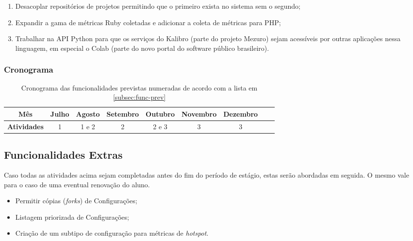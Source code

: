 \documentclass[12pt]{article}
\begin{document}
      \begin{enumerate}
        \item Desacoplar repositórios de projetos permitindo que o primeiro exista no sistema sem o segundo;
        \item Expandir a gama de métricas Ruby coletadas e adicionar a coleta de métricas para PHP;
        \item Trabalhar na API Python para que os serviços do Kalibro (parte do projeto Mezuro) sejam acessíveis por outras aplicações nessa linguagem, em especial o Colab (parte do novo portal do software público brasileiro).
      \end{enumerate}

      \subsubsection{Cronograma}
        \begin{table}[H]
          \begin{tabu}{| c | c | c | c | c | c | c | c | c |}
            \hline
            \textbf{Mês} & Julho & Agosto & Setembro & Outubro & Novembro & Dezembro\\ \hline
            \textbf{Atividades} & 1 & 1 e 2 & 2 & 2 e 3 & 3 & 3 \\ \hline
          \end{tabu}
          \caption{Cronograma das funcionalidades previstas numeradas de acordo com a lista em \ref{subsec:func-prev}}
        \end{table}

    \subsection{Funcionalidades Extras}
      Caso todas as atividades acima sejam completadas antes do fim do período de estágio, estas serão abordadas em seguida. O mesmo vale para o caso de uma eventual renovação do aluno.

      \begin{itemize}
        \item Permitir cópias (\textit{forks}) de Configurações;
        \item Listagem priorizada de Configurações;
        \item Criação de um subtipo de configuração para métricas de \textit{hotspot}.
      \end{itemize}
\end{document}
